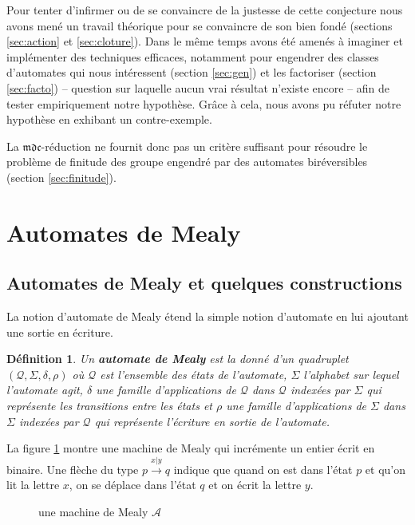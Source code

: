 \documentclass[11pt,a4paper]{article}
\newtheorem{definition}{Définition}
\begin{document}
Pour tenter d'infirmer ou de se convaincre de la justesse de cette conjecture nous avons mené un travail théorique pour se convaincre de son bien fondé (sections \ref{sec:action} et \ref{sec:cloture}). Dans le même temps avons été amenés à imaginer et implémenter des techniques efficaces, notamment pour engendrer des classes d'automates qui nous intéressent (section \ref{sec:gen}) et les factoriser (section \ref{sec:facto}) -- question sur laquelle aucun vrai résultat n'existe encore -- afin de tester empiriquement notre hypothèse. Grâce à cela, nous avons pu réfuter notre hypothèse en exhibant un contre-exemple.

La $\mathfrak{mdc}$-réduction ne fournit donc pas un critère suffisant pour résoudre le problème de finitude des groupe engendré par des automates biréversibles (section \ref{sec:finitude}).

\section{Automates de Mealy}

\subsection{Automates de Mealy et quelques constructions}

La notion d'automate de Mealy étend la simple notion d'automate en lui ajoutant une sortie en écriture.

\begin{definition}
  Un \textbf{automate de Mealy} est la donné d'un quadruplet $\left(\mathcal{Q}, \Sigma, \delta, \rho\right)$ où $\mathcal{Q}$ est l'ensemble des états de l'automate, $\Sigma$ l'alphabet sur lequel l'automate agit, $\delta$ une famille d'applications de $\mathcal{Q}$ dans $\mathcal{Q}$ indexées par $\Sigma$ qui représente les transitions entre les états et $\rho$ une famille d'applications de $\Sigma$ dans $\Sigma$ indexées par $\mathcal{Q}$ qui représente l'écriture en sortie de l'automate.
\end{definition}

La figure \ref{fig:example} montre une machine de Mealy qui incrémente un entier écrit en binaire. Une flèche du type $p\overset{x|y}{\longrightarrow}q$ indique que quand on est dans l'état $p$ et qu'on lit la lettre $x$, on se déplace dans l'état $q$ et on écrit la lettre $y$.

\begin{figure}[h]
  \begin{center}
    \caption{une machine de Mealy $\mathcal{A}$ \label{fig:example}}
  \end{center}
\end{figure}
\end{document}

